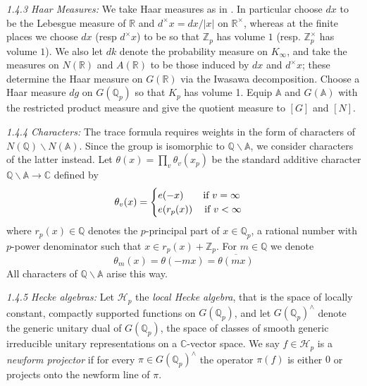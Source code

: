 \documentclass{article}
\numberwithin{equation}{section}
\begin{document}
\noindent \emph{1.4.3 Haar Measures:} We take Haar measures as in \cite[\S 7]{Traces}. In particular choose $dx$ to be the Lebesgue measure of $\mathbb{R}$ and $d^\times x=dx/|x|$ on $\mathbb{R}^\times$, whereas at the finite places we choose $dx$ (resp $d^\times x$) to be so that $\mathbb{Z}_p$ has volume $1$ (resp. $\mathbb{Z}_p^\times$ has volume $1$). We also let $dk$ denote the probability measure on $K_\infty$, and take the measures on $N(\mathbb{R})$ and $A(\mathbb{R})$ to be those induced by $dx$ and $d^\times x$; these determine the Haar measure on $G(\mathbb{R})$ via the Iwasawa decomposition. Choose a Haar measure $dg$ on $G(\mathbb{Q}_p)$ so that $K_p$ has volume 1. Equip $\mathbb{A}$ and $G(\mathbb{A})$ with the restricted product measure and give the quotient measure to $[G]$ and $[N]$. \bigbreak 

\noindent \emph{1.4.4 Characters:} The trace formula requires weights in the form of characters of $N(\mathbb{Q})\backslash N(\mathbb{A})$. Since the group is isomorphic to $\mathbb{Q}\backslash\mathbb{A}$, we consider characters of the latter instead. Let $\theta(x)=\prod_v\theta_v(x_p)$ be the standard additive character $\mathbb{Q}\backslash \mathbb{A} \to \mathbb{C}$
defined by
\begin{equation}
    \theta_v(x)=\begin{cases}
    e(-x) \qquad \text{if } v=\infty \\
    e(r_p(x)) \hspace{0.43cm} \text{if } v <\infty
    \end{cases}
\end{equation}
where $r_p(x) \in \mathbb{Q}$ denotes the $p$-principal part of $x\in \mathbb{Q}_p$, a rational number with $p$-power denominator such that $x\in r_p(x)+\mathbb{Z}_p$. For $m \in \mathbb{Q}$ we denote
\begin{equation}
    \theta_m(x)=\theta(-mx) = \overline{\theta(mx)}
\end{equation}
All characters of $\mathbb{Q}\backslash \mathbb{A}$ arise this way. \bigbreak 

\noindent \emph{1.4.5 Hecke algebras:} Let $\mathcal{H}_p$ the \emph{local Hecke algebra}, that is the space of locally constant, compactly supported functions on $G(\mathbb{Q}_p)$, and let $G(\mathbb{Q}_p)^\wedge$ denote the generic unitary dual of $G(\mathbb{Q}_p)$, the space of classes of smooth generic irreducible unitary representations on a $\mathbb{C}$-vector space. We say $f \in \mathcal{H}_p$ is a \emph{newform projector} if for every $\pi\in G(\mathbb{Q}_p)^\wedge$ the operator $\pi(f)$ is either $0$ or projects onto the newform line of $\pi$. 
\end{document}
